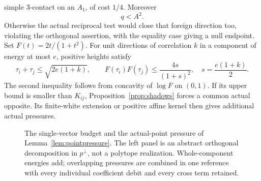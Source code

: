 \documentclass[11pt]{article}
\theoremstyle{definition}
\theoremstyle{remark}
\begin{document}
simple \(3\)-contact on an \(A_1\), of cost \(1/4\).
Moreover
\begin{equation}\label{eq:foreigncost}
 q<A^2.
\end{equation}
Otherwise the actual reciprocal test would close that foreign
direction too, violating the orthogonal assertion, with the
equality case giving a null endpoint.
Set \(F(t)=2t/(1+t^2)\). For unit directions of correlation \(k\)
in a component of energy at most \(e\), positive heights satisfy
\begin{equation}\label{eq:pairupper}
 \tau_i+\tau_j\leq\sqrt{2e(1+k)},\qquad
 F(\tau_i)F(\tau_j)\leq\frac{4s}{(1+s)^2},\quad
 s=\frac{e(1+k)}2.
\end{equation}
The second inequality follows from concavity of \(\log F\) on
\((0,1)\). If its upper bound is smaller than \(K_{ij}\),
Proposition~\ref{prop:shadows} forces a common actual opposite.
Its finite-white extension or positive affine kernel then gives
additional actual pressures.

\begin{figure}[tbp]
\centering
{}
\caption{The single-vector budget and the actual-point pressure of
Lemma~\ref{lem:pointpressure}. The left panel is an abstract orthogonal
decomposition in \(p^\perp\), not a polytope realization. Whole-component
energies add; overlapping pressures are combined in one reference with
every individual coefficient debit and every cross term retained.}
\label{fig:ill20261026:c17:budget}
\end{figure}
\end{document}
